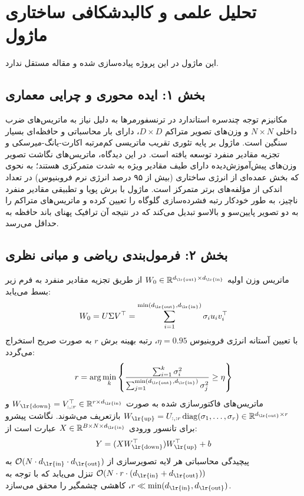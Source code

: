 \section{تحلیل علمی و کالبدشکافی ساختاری ماژول }

این ماژول در این پروژه پیاده‌سازی شده و مقاله مستقل ندارد.
\label{sec:minimal_nova}

\subsection*{بخش ۱: ایده محوری و چرایی معماری }
مکانیزم توجه چندسره استاندارد  در ترنسفورمرها به دلیل نیاز به ماتریس‌های ضرب داخلی $N \times N$ و وزن‌های تصویر متراکم $D \times D$، دارای بار محاسباتی و حافظه‌ای بسیار سنگین است. ماژول  بر پایه تئوری تقریب ماتریسی کم‌مرتبه اکارت-یانگ-میرسکی  و تجزیه مقادیر منفرد  توسعه یافته است. در این دیدگاه، ماتریس‌های نگاشت تصویر وزن‌های پیش‌آموزش‌دیده  دارای طیف مقادیر ویژه به شدت متمرکزی هستند؛ به نحوی که بخش عمده‌ای از انرژی ساختاری (بیش از ۹۵ درصد انرژی نرم فروبنیوس) در تعداد اندکی از مؤلفه‌های برتر متمرکز است. ماژول  با برش پویا و تطبیقی مقادیر منفرد ناچیز، به طور خودکار رتبه فشرده‌سازی گلوگاه را تعیین کرده و ماتریس‌های متراکم را به دو تصویر پایین‌سو و بالاسو تبدیل می‌کند که در نتیجه آن ترافیک پهنای باند حافظه  به حداقل می‌رسد.

\subsection*{بخش ۲: فرمول‌بندی ریاضی و مبانی نظری }
ماتریس وزن اولیه $W_0 \in \mathbb{R}^{d_{\text{\lr{out}}} \times d_{\text{\lr{in}}}}$ از طریق تجزیه مقادیر منفرد به فرم زیر بسط می‌یابد:
\begin{equation}
W_0 = U \Sigma V^\top = \sum_{i=1}^{\min(d_{\text{\lr{out}}}, d_{\text{\lr{in}}})} \sigma_i u_i v_i^\top
\end{equation}
با تعیین آستانه انرژی فروبنیوس $\eta = 0.95$، رتبه بهینه برش $r$ به صورت صریح استخراج می‌گردد:
\begin{equation}
r = \arg\min_k \left\{ \frac{\sum_{i=1}^k \sigma_i^2}{\sum_{j=1}^{\min(d_{\text{\lr{out}}}, d_{\text{\lr{in}}})} \sigma_j^2} \ge \eta \right\}
\end{equation}
ماتریس‌های فاکتورسازی شده به صورت $W_{\text{\lr{down}}} = V_{:, :r}^\top \in \mathbb{R}^{r \times d_{\text{\lr{in}}}}$ و $W_{\text{\lr{up}}} = U_{:, :r} \operatorname{diag}(\sigma_1, \dots, \sigma_r) \in \mathbb{R}^{d_{\text{\lr{out}}} \times r}$ بازتعریف می‌شوند. نگاشت پیشرو برای تانسور ورودی $X \in \mathbb{R}^{B \times N \times d_{\text{\lr{in}}}}$ عبارت است از:
\begin{equation}
Y = (X W_{\text{\lr{down}}}^\top) W_{\text{\lr{up}}}^\top + b
\end{equation}
پیچیدگی محاسباتی هر لایه تصویرسازی از $\mathcal{O}(N \cdot d_{\text{\lr{in}}} \cdot d_{\text{\lr{out}}})$ به $\mathcal{O}(N \cdot r \cdot (d_{\text{\lr{in}}} + d_{\text{\lr{out}}}))$ تنزل می‌یابد که با توجه به $r \ll \min(d_{\text{\lr{in}}}, d_{\text{\lr{out}}})$، کاهشی چشمگیر را محقق می‌سازد.

